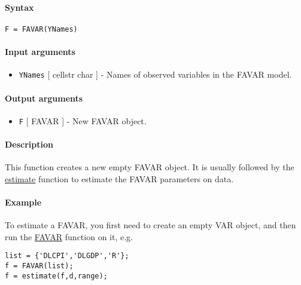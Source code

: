 


	\paragraph{Syntax}

\begin{verbatim}
F = FAVAR(YNames)
\end{verbatim}

\paragraph{Input arguments}

\begin{itemize}
\itemsep1pt\parskip0pt
\item
  \texttt{YNames} {[} cellstr \textbar{} char {]} - Names of observed
  variables in the FAVAR model.
\end{itemize}

\paragraph{Output arguments}

\begin{itemize}
\itemsep1pt\parskip0pt
\item
  \texttt{F} {[} FAVAR {]} - New FAVAR object.
\end{itemize}

\paragraph{Description}

This function creates a new empty FAVAR object. It is usually followed
by the \href{FAVAR/estimate}{estimate} function to estimate the FAVAR
parameters on data.

\paragraph{Example}

To estimate a FAVAR, you first need to create an empty VAR object, and
then run the \href{FAVAR/estimate}{FAVAR} function on it, e.g.

\begin{verbatim}
list = {'DLCPI','DLGDP','R'};
f = FAVAR(list);
f = estimate(f,d,range);
\end{verbatim}


